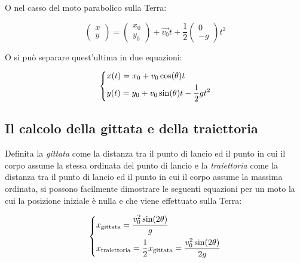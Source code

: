 O nel casso del moto parabolico sulla Terra:

\begin{equation}
    \begin{pmatrix}
        x \\
        y
    \end{pmatrix} = \begin{pmatrix}
        x_0 \\
        y_0
    \end{pmatrix} + \vec{v_0} t + \frac12 \begin{pmatrix}
        0 \\
        -g
    \end{pmatrix} t^2
\end{equation}

O si può separare quest'ultima in due equazioni:

\begin{equation}
    \begin{dcases}
        x(t)=x_0+v_0\cos(\theta)t \\
        y(t)=y_0+v_0\sin(\theta)t-\frac12gt^2
    \end{dcases}
\end{equation}

\subsection{Il calcolo della gittata e della traiettoria}

Definita la \textit{gittata} come la distanza tra il punto di lancio ed
il punto in cui il corpo assume la stessa ordinata del punto di lancio e
la \textit{traiettoria} come la distanza tra il punto di lancio ed il
punto in cui il corpo assume la massima ordinata, si possono facilmente
dimostrare le seguenti equazioni per un moto la cui la posizione iniziale
è nulla e che viene effettuato sulla Terra:

\begin{equation}
    \displaystyle
    \begin{dcases}
        x_{\text{gittata}} = \frac{v_0^2 \sin(2\theta)}{g} \\
        x_{\text{traiettoria}} = \frac12 x_{\text{gittata}} = \frac{v_0^2 \sin(2\theta)}{2g}
    \end{dcases}
\end{equation}

